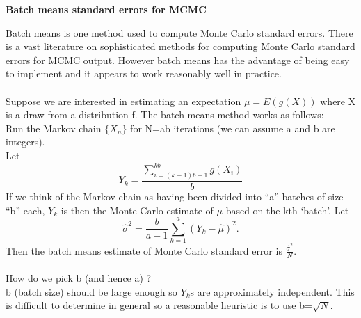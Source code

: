\documentclass[11pt]{article}
\begin{document}
\pagestyle{empty}
\begin{center}
\Large
{\bf  Batch means standard errors for MCMC}\\
\end{center}
Batch means is one method used to compute Monte Carlo standard errors.
There is a vast literature on sophisticated methods for computing
Monte Carlo standard errors for MCMC output. However batch means has
the advantage of being easy to implement and it appears to work
reasonably
well in practice.\\\\
Suppose we are interested in estimating an expectation $\mu=E(g(X))$
where X is a draw from a distribution f.
The batch means method works as follows:\\
Run the Markov chain $\{X_n\}$ for N=ab iterations (we can assume a and b are integers).\\
Let $$Y_k=\frac{\sum_{i=(k-1)b+1}^{kb} g(X_i)}{b} $$
If we think of the Markov chain as having been divided into ``a''
batches of size ``b'' each, $Y_k$ is then the Monte Carlo estimate of
$\mu$ based on the kth `batch'. Let
$$\hat{\sigma}^2=\frac{b}{a-1} \sum_{k=1}^a (Y_k-\hat{\mu})^2.$$
Then the batch means estimate of Monte Carlo standard error is $\frac{\hat{\sigma}^2}{N}$.\\\\
How do we pick b (and hence a) ? \\
b (batch size) should be large enough
so $Y_k$s are approximately independent. This is difficult to
determine in general so a reasonable heuristic is to use b=$\sqrt{N}$.
\end{document}
